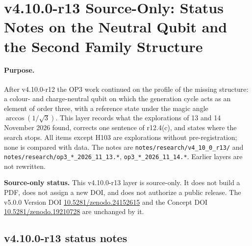 
\clearpage
\section*{v4.10.0-r13 Source-Only: Status Notes on the Neutral Qubit and the Second Family Structure}
\label{sec:v4100-r13-neutral-qubit-family}

\paragraph{Purpose.}
After v4.10.0-r12 the OP3 work continued on the profile of the missing structure: a colour- and charge-neutral qubit on
which the generation cycle acts as an element of order three, with a reference state under the magic angle
\(\arccos(1/\sqrt3)\).  This layer records what the explorations of 13 and 14 November 2026 found, corrects one sentence of
r12.4(c), and states where the search stops.  All items except H103 are explorations without pre-registration; none is
compared with data.  The notes are \texttt{notes/\allowbreak research/\allowbreak v4\_10\_0\_r13/} and
\texttt{notes/\allowbreak research/\allowbreak op3\_*\_2026\_11\_13.*}, \texttt{op3\_*\_2026\_11\_14.*}.  Earlier layers are not rewritten.

\noindent\textbf{Source-only status.}
This v4.10.0-r13 layer is source-only.  It does not build a PDF, does not assign a new DOI,
and does not authorize a public release.  The v5.0.0 Version DOI
\href{https://doi.org/10.5281/zenodo.24152615}{10.5281/zenodo.24152615} and the Concept DOI
\href{https://doi.org/10.5281/zenodo.19210728}{10.5281/zenodo.19210728} are unchanged by it.

\subsection*{v4.10.0-r13 status notes}
\label{subsec:v4100-r13-status}

